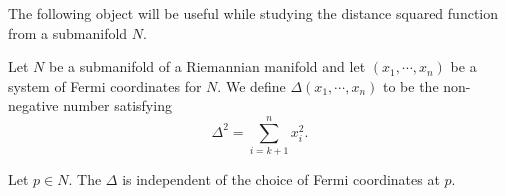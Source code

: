 \bigskip 

\hf The following object will be useful while studying the distance squared function from a submanifold $N$.
\begin{defn}\label{defn:DeltaMap}
    Let $N$ be a submanifold of a Riemannian manifold and let $(x_1,\cdots,x_n)$ be a system of Fermi coordinates for $N$. We define $\Delta(x_1,\cdots,x_n)$ to be the non-negative number satisfying
    \begin{displaymath}
        \Delta^2 = \sum_{i=k+1}^n x_i^2.
    \end{displaymath}
\end{defn}


\begin{lemma}
    Let $p\in N$. The $\Delta$ is independent of the choice of Fermi coordinates at $p$.
\end{lemma}
